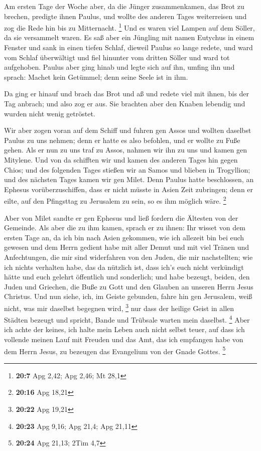  Am ersten Tage der Woche aber, da die Jünger zusammenkamen,
das Brot zu brechen, predigte ihnen Paulus, und wollte des anderen Tages
weiterreisen und zog die Rede hin bis zu Mitternacht. \footnote{\textbf{20:7}
  Apg 2,42; Apg 2,46; Mt 28,1}  Und es waren viel Lampen auf
dem Söller, da sie versammelt waren.  Es saß aber ein
Jüngling mit namen Eutychus in einem Fenster und sank in einen tiefen
Schlaf, dieweil Paulus so lange redete, und ward vom Schlaf überwältigt
und fiel hinunter vom dritten Söller und ward tot aufgehoben.
 Paulus aber ging hinab und legte sich auf ihn, umfing ihn
und sprach: Machet kein Getümmel; denn seine Seele ist in ihm.

 Da ging er hinauf und brach das Brot und aß und redete
viel mit ihnen, bis der Tag anbrach; und also zog er aus. 
Sie brachten aber den Knaben lebendig und wurden nicht wenig getröstet.

 Wir aber zogen voran auf dem Schiff und fuhren gen Assos
und wollten daselbst Paulus zu uns nehmen; denn er hatte es also
befohlen, und er wollte zu Fuße gehen.  Als er nun zu uns
traf zu Assos, nahmen wir ihn zu uns und kamen gen Mitylene.
 Und von da schifften wir und kamen des anderen Tages hin
gegen Chios; und des folgenden Tages stießen wir an Samos und blieben in
Trogyllion; und des nächsten Tages kamen wir gen Milet. 
Denn Paulus hatte beschlossen, an Ephesus vorüberzuschiffen, dass er
nicht müsste in Asien Zeit zubringen; denn er eilte, auf den Pfingsttag
zu Jerusalem zu sein, so es ihm möglich wäre. \footnote{\textbf{20:16}
  Apg 18,21}

 Aber von Milet sandte er gen Ephesus und ließ fordern die
Ältesten von der Gemeinde.  Als aber die zu ihm kamen,
sprach er zu ihnen: Ihr wisset von dem ersten Tage an, da ich bin nach
Asien gekommen, wie ich allezeit bin bei euch gewesen  und
dem Herrn gedient habe mit aller Demut und mit viel Tränen und
Anfechtungen, die mir sind widerfahren von den Juden, die mir
nachstellten;  wie ich nichts verhalten habe, das da
nützlich ist, dass ich's euch nicht verkündigt hätte und euch gelehrt
öffentlich und sonderlich;  und habe bezeugt, beiden, den
Juden und Griechen, die Buße zu Gott und den Glauben an unseren Herrn
Jesus Christus.  Und nun siehe, ich, im Geiste gebunden,
fahre hin gen Jerusalem, weiß nicht, was mir daselbst begegnen wird,
\footnote{\textbf{20:22} Apg 19,21}  nur dass der heilige
Geist in allen Städten bezeugt und spricht, Bande und Trübsale warten
mein daselbst. \footnote{\textbf{20:23} Apg 9,16; Apg 21,4; Apg 21,11}
 Aber ich achte der keines, ich halte mein Leben auch nicht
selbst teuer, auf dass ich vollende meinen Lauf mit Freuden und das Amt,
das ich empfangen habe von dem Herrn Jesus, zu bezeugen das Evangelium
von der Gnade Gottes. \footnote{\textbf{20:24} Apg 21,13; 2Tim 4,7}

